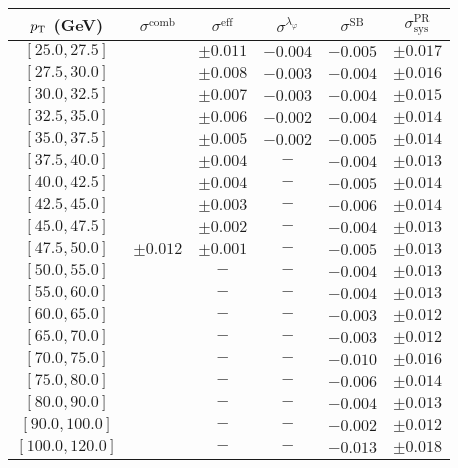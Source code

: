 \begin{tabular}{c||c|c|c|c||c}
$p_\text{T}$ (GeV) & $\sigma^{\text{comb}}$ & $\sigma^{\text{eff}}$ & $\sigma^{\lambda_\varphi}$ & $\sigma^{\text{SB}}$ & $\sigma_{\text{sys}}^{\text{PR}}$  \\
\hline
$[25.0, 27.5]$ & \multirow{19}{*}{$\pm0.012$} & $\pm0.011$ & $-0.004$ & $-0.005$ & $\pm0.017$\\
$[27.5, 30.0]$ &  & $\pm0.008$ & $-0.003$ & $-0.004$ & $\pm0.016$\\
$[30.0, 32.5]$ &  & $\pm0.007$ & $-0.003$ & $-0.004$ & $\pm0.015$\\
$[32.5, 35.0]$ &  & $\pm0.006$ & $-0.002$ & $-0.004$ & $\pm0.014$\\
$[35.0, 37.5]$ &  & $\pm0.005$ & $-0.002$ & $-0.005$ & $\pm0.014$\\
$[37.5, 40.0]$ &  & $\pm0.004$ & $-$ & $-0.004$ & $\pm0.013$\\
$[40.0, 42.5]$ &  & $\pm0.004$ & $-$ & $-0.005$ & $\pm0.014$\\
$[42.5, 45.0]$ &  & $\pm0.003$ & $-$ & $-0.006$ & $\pm0.014$\\
$[45.0, 47.5]$ &  & $\pm0.002$ & $-$ & $-0.004$ & $\pm0.013$\\
$[47.5, 50.0]$ &  & $\pm0.001$ & $-$ & $-0.005$ & $\pm0.013$\\
$[50.0, 55.0]$ &  & $-$ & $-$ & $-0.004$ & $\pm0.013$\\
$[55.0, 60.0]$ &  & $-$ & $-$ & $-0.004$ & $\pm0.013$\\
$[60.0, 65.0]$ &  & $-$ & $-$ & $-0.003$ & $\pm0.012$\\
$[65.0, 70.0]$ &  & $-$ & $-$ & $-0.003$ & $\pm0.012$\\
$[70.0, 75.0]$ &  & $-$ & $-$ & $-0.010$ & $\pm0.016$\\
$[75.0, 80.0]$ &  & $-$ & $-$ & $-0.006$ & $\pm0.014$\\
$[80.0, 90.0]$ &  & $-$ & $-$ & $-0.004$ & $\pm0.013$\\
$[90.0, 100.0]$ &  & $-$ & $-$ & $-0.002$ & $\pm0.012$\\
$[100.0, 120.0]$ &  & $-$ & $-$ & $-0.013$ & $\pm0.018$\\
\end{tabular}
